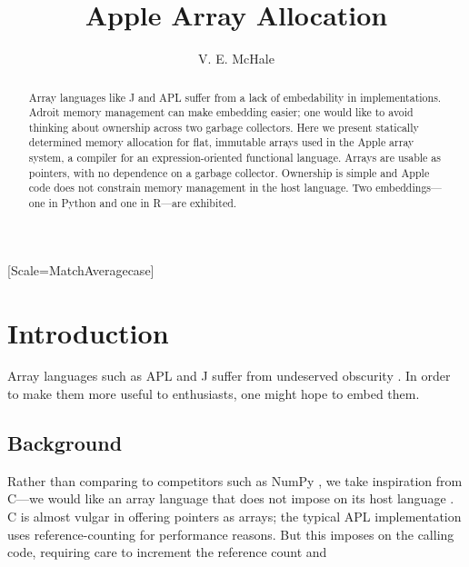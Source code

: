 \documentclass[acmsmall,screen,anonymous,nonacm]{acmart}
\begin{document}
\setmonofont{Jet Brains Mono}[Scale=MatchAveragecase]


\begin{abstract}
    Array languages like J and APL suffer from a lack of embedability in implementations. Adroit memory management can make embedding easier; one would like to avoid thinking about ownership across two garbage collectors.
    Here we present statically determined memory allocation for flat, immutable arrays used in the Apple array system, a compiler for an expression-oriented functional language.
    Arrays are usable as pointers, with no dependence on a garbage collector.
    Ownership is simple and Apple code does not constrain memory management in the host language.
    Two embeddings---one in Python and one in R---are exhibited.
\end{abstract}

\title{Apple Array Allocation}
\author{V. E. McHale}
\maketitle

\section{Introduction}

Array languages such as APL and J suffer from undeserved obscurity \cite{hsu2023}. In order to make them more useful to enthusiasts, one might hope to embed them. %

\subsection{Background}

Rather than comparing to competitors such as NumPy \cite{harris2020}, we take inspiration from C---we would like an array language that does not impose on its host language \cite{kell2017}.
C is almost vulgar in offering pointers as arrays; the typical APL implementation uses reference-counting \cite[p.~47]{hui2020} for performance reasons.
But this imposes on the calling code, requiring care to increment the reference count and %
\end{document}
